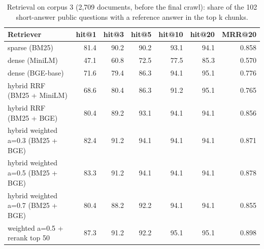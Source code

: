 \begin{table}[t]
\centering
\small
\begin{tabular}{lrrrrrr}
\toprule
Retriever & hit@1 & hit@3 & hit@5 & hit@10 & hit@20 & MRR@20 \\
\midrule
sparse (BM25) & 81.4 & 90.2 & 90.2 & 93.1 & 94.1 & 0.858 \\
dense (MiniLM) & 47.1 & 60.8 & 72.5 & 77.5 & 85.3 & 0.570 \\
dense (BGE-base) & 71.6 & 79.4 & 86.3 & 94.1 & 95.1 & 0.776 \\
hybrid RRF (BM25 + MiniLM) & 68.6 & 80.4 & 86.3 & 91.2 & 95.1 & 0.765 \\
hybrid RRF (BM25 + BGE) & 80.4 & 89.2 & 93.1 & 94.1 & 94.1 & 0.856 \\
hybrid weighted a=0.3 (BM25 + BGE) & 82.4 & 91.2 & 94.1 & 94.1 & 94.1 & 0.871 \\
hybrid weighted a=0.5 (BM25 + BGE) & 83.3 & 91.2 & 94.1 & 94.1 & 94.1 & 0.878 \\
hybrid weighted a=0.7 (BM25 + BGE) & 80.4 & 88.2 & 92.2 & 94.1 & 94.1 & 0.855 \\
weighted a=0.5 + rerank top 50 & 87.3 & 91.2 & 92.2 & 95.1 & 95.1 & 0.898 \\
\bottomrule
\end{tabular}
\caption{Retrieval on corpus 3 (2,709 documents, before the final crawl): share of the 102 short-answer public questions with a reference answer in the top k chunks.}
\label{tab:retrieval}
\end{table}
